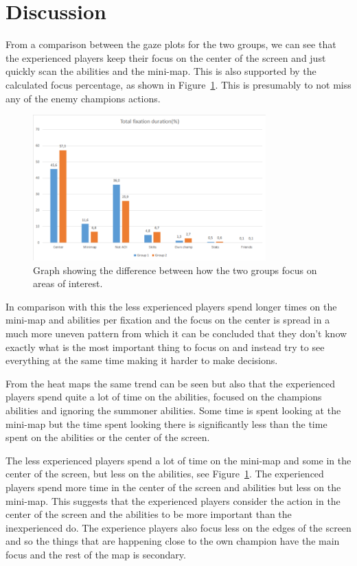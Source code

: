 \documentclass[notitlepage]{report}
\begin{document}
\section{Discussion}
From a comparison between the gaze plots for the two groups, we can see that the experienced players keep their focus on the center of the screen and just quickly scan the abilities and the mini-map. This is also supported by the calculated focus percentage, as shown in Figure~\ref{aoi}. This is presumably to not miss any of the enemy champions actions.

\begin{figure}[h]
\centering
\includegraphics[width=0.8\textwidth]{images/AOIChart}
\caption{Graph showing the difference between how the two groups focus on areas of interest.}
\label{aoi}
\end{figure}

In comparison with this the less experienced players spend longer times on the mini-map and abilities per fixation and the focus on the center is spread in a much more uneven pattern from which it can be concluded that they don't know exactly what is the most important thing to focus on and instead try to see everything at the same time making it harder to make decisions.

From the heat maps the same trend can be seen but also that the experienced players spend quite a lot of time on the abilities, focused on the champions abilities and ignoring the summoner abilities. Some time is spent looking at the mini-map but the time spent looking there is significantly less than the time spent on the abilities or the center of the screen.

The less experienced players spend a lot of time on the mini-map and some in the center of the screen, but less on the abilities, see Figure~\ref{aoi}. The experienced players spend more time in the center of the screen and abilities but less on the mini-map. This suggests that the experienced players consider the action in the center of the screen and the abilities to be more important than the inexperienced do. The experience players also focus less on the edges of the screen and so the things that are happening close to the own champion have the main focus and the rest of the map is secondary.
\end{document}
